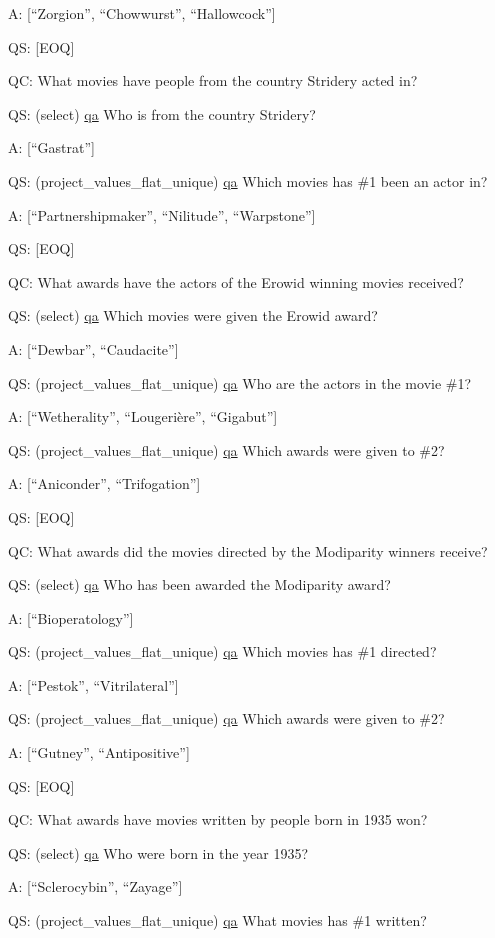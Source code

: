 \documentclass[
]{article}
\begin{document}
A: {[}``Zorgion'', ``Chowwurst'', ``Hallowcock''{]}

QS: {[}EOQ{]}

QC: What movies have people from the country Stridery acted in?

QS: (select) \hyperref[qa]{qa} Who is from the country Stridery?

A: {[}``Gastrat''{]}

QS: (project\_values\_flat\_unique) \hyperref[qa]{qa} Which movies has
\#1 been an actor in?

A: {[}``Partnershipmaker'', ``Nilitude'', ``Warpstone''{]}

QS: {[}EOQ{]}

QC: What awards have the actors of the Erowid winning movies received?

QS: (select) \hyperref[qa]{qa} Which movies were given the Erowid award?

A: {[}``Dewbar'', ``Caudacite''{]}

QS: (project\_values\_flat\_unique) \hyperref[qa]{qa} Who are the actors
in the movie \#1?

A: {[}``Wetherality'', ``Lougerière'', ``Gigabut''{]}

QS: (project\_values\_flat\_unique) \hyperref[qa]{qa} Which awards were
given to \#2?

A: {[}``Aniconder'', ``Trifogation''{]}

QS: {[}EOQ{]}

QC: What awards did the movies directed by the Modiparity winners
receive?

QS: (select) \hyperref[qa]{qa} Who has been awarded the Modiparity
award?

A: {[}``Bioperatology''{]}

QS: (project\_values\_flat\_unique) \hyperref[qa]{qa} Which movies has
\#1 directed?

A: {[}``Pestok'', ``Vitrilateral''{]}

QS: (project\_values\_flat\_unique) \hyperref[qa]{qa} Which awards were
given to \#2?

A: {[}``Gutney'', ``Antipositive''{]}

QS: {[}EOQ{]}

QC: What awards have movies written by people born in 1935 won?

QS: (select) \hyperref[qa]{qa} Who were born in the year 1935?

A: {[}``Sclerocybin'', ``Zayage''{]}

QS: (project\_values\_flat\_unique) \hyperref[qa]{qa} What movies has
\#1 written?
\end{document}
